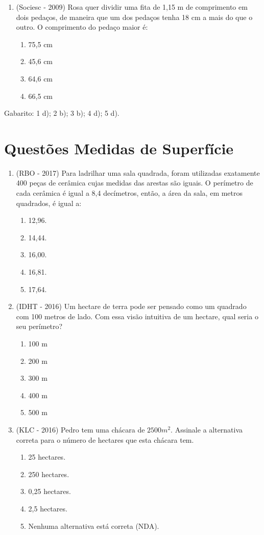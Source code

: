 \begin{enumerate}
 \item (Sociesc - 2009) Rosa quer dividir uma fita de 1,15 m de comprimento em dois pedaços, de maneira que um dos pedaços tenha 18 cm a mais do que o outro. O comprimento do pedaço maior é:
 \begin{enumerate}
  \item 75,5 cm
  \item 45,6 cm
  \item 64,6 cm
  \item 66,5 cm
 \end{enumerate}

 \end{enumerate}

 Gabarito: 1 d); 2 b); 3 b); 4 d); 5 d).

 \section{Questões Medidas de Superfície}
\begin{enumerate}
 \item (RBO - 2017) Para ladrilhar uma sala quadrada, foram utilizadas exatamente 400 peças de cerâmica cujas medidas das arestas são iguais. O perímetro de cada cerâmica é igual a 8,4 decímetros, então, a área da sala, em metros quadrados, é igual a:
 \begin{enumerate}
 \item 12,96.
 \item 14,44.
 \item 16,00.
 \item 16,81.
 \item 17,64.
\end{enumerate}

\item (IDHT - 2016) Um hectare de terra pode ser pensado como um quadrado com 100 metros de lado. Com essa visão intuitiva de um hectare, qual seria o seu perímetro?
\begin{enumerate}
 \item 100 m
 \item 200 m
 \item 300 m
 \item 400 m
 \item 500 m
\end{enumerate}

\item (KLC - 2016) Pedro tem uma chácara de $2500 m^2$. Assinale a alternativa correta para o número de hectares que esta chácara tem.
\begin{enumerate}
 \item 25 hectares.
 \item 250 hectares.
 \item 0,25 hectares.
 \item 2,5 hectares.
 \item Nenhuma alternativa está correta (NDA).
\end{enumerate}
\end{enumerate}


